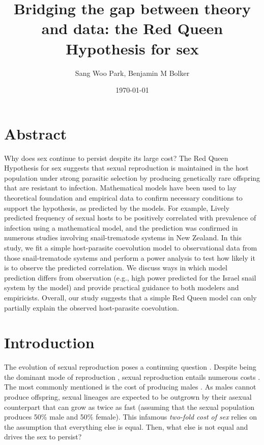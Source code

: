 \documentclass{article}\usepackage[]{graphicx}\usepackage[]{color}
\title{Bridging the gap between theory and data: the Red Queen Hypothesis for sex}
\author{Sang Woo Park, Benjamin M Bolker}
\date{\today}
\begin{document}
\maketitle

\section*{Abstract}

Why does sex continue to persist despite its large cost?
The Red Queen Hypothesis for sex suggests that sexual reproduction is maintained in the host population under strong parasitic selection by producing genetically rare offspring that are resistant to infection.
Mathematical models have been used to lay theoretical foundation and empirical data to confirm necessary conditions to support the hypothesis, as predicted by the models.
For example, Lively predicted frequency of sexual hosts to be positively correlated with prevalence of infection using a mathematical model, and the prediction was confirmed in numerous studies involving snail-trematode systems in New Zealand.
In this study, we fit a simple host-parasite coevolution model to observational data from those snail-trematode systems and perform a power analysis to test how likely it is to observe the predicted correlation.
We discuss ways in which model prediction differs from observation (e.g., high power predicted for the Israel snail system by the model) and provide practical guidance to both modelers and empiricists.
Overall, our study suggests that a simple Red Queen model can only partially explain the observed host-parasite coevolution.

\section{Introduction}

The evolution of sexual reproduction poses a continuing question \citep{otto2009evolutionary}.
Despite being the dominant mode of reproduction \citep{vrijenhoek1998animal}, sexual reproduction entails numerous costs \citep{lehtonen2012many}.
The most commonly mentioned is the cost of producing males \citep{smith1978evolution}.
As males cannot produce offspring, sexual lineages are expected to be outgrown by their asexual counterpart that can grow as twice as fast (assuming that the sexual population produces 50\% male and 50\% female).
This infamous \emph{two-fold cost of sex} \citep{smith1978evolution} relies on the assumption that everything else is equal.
Then, what else is not equal and drives the sex to persist?
\end{document}
